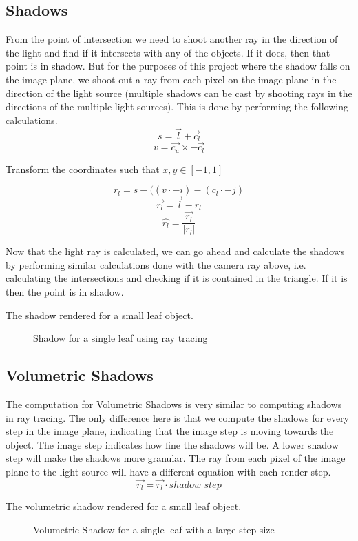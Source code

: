 \documentclass[paper=a4, fontsize=11pt]{scrartcl}
\numberwithin{equation}{section}		%
\numberwithin{figure}{section}			%
\numberwithin{table}{section}				%
\begin{document}
\subsection{Shadows}
From the point of intersection we need to shoot another ray in the direction of the light and find if it intersects with any of the objects. If it does, then that point is in shadow. But for the purposes of this project where the shadow falls on the image plane, we shoot out a ray from each pixel on the image plane in the direction of the light source (multiple shadows can be cast by shooting rays in the directions of the multiple light sources). This is done by performing the following calculations.
\[ s = \overrightarrow{l} + \overrightarrow{c_{l}} \]
\[ v = \overrightarrow{c_{u}} \times -\overrightarrow{c_{l}}\]

Transform the coordinates such that $x, y \in [-1, 1]$

\[ r_{l} = s - ((v \cdot -i) - (c_{l} \cdot -j) \]
\[ \overrightarrow{r_{l}} = \overrightarrow{l} - r_{l} \]
\[ \hat{r_{l}} = \dfrac{\overrightarrow{r_{l}}}{\lvert r_{l} \rvert} \]

Now that the light ray is calculated, we can go ahead and calculate the shadows by performing similar calculations done with the camera ray above, i.e. calculating the intersections and checking if it is contained in the triangle. If it is then the point is in shadow.
\par
The shadow rendered for a small leaf object.
\vspace{20pt}
\begin{figure}[h]
\centering
{}
\caption{Shadow for a single leaf using ray tracing}
\end{figure}

\newpage
\subsection{Volumetric Shadows}
The computation for Volumetric Shadows is very similar to computing shadows in ray tracing. The only difference here is that we compute the shadows for every step in the image plane, indicating that the image step is moving towards the object.
The image step indicates how fine the shadows will be. A lower shadow step will make the shadows more granular.
The ray from each pixel of the image plane to the light source will have a different equation with each render step.\
\[ \overrightarrow{r_{l}} = \overrightarrow{r_{l}} \cdot shadow\_step \]
\par The volumetric shadow rendered for a small leaf object.
\vspace{20pt}
\begin{figure}[h]
\centering
{}
\caption{Volumetric Shadow for a single leaf with a large step size}
\end{figure}
\end{document}
